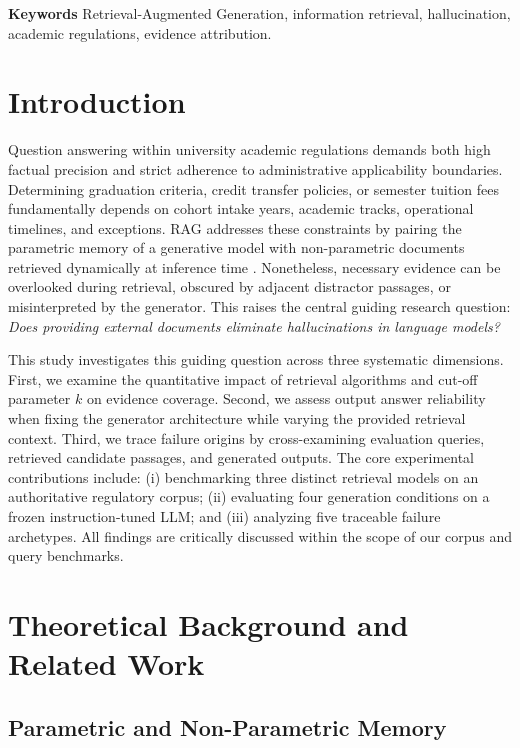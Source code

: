 \documentclass[12pt,a4paper]{article}
\begin{document}
\textbf{Keywords} \textperiodcentered{} Retrieval-Augmented Generation, information retrieval, hallucination, academic regulations, evidence attribution.

\section{Introduction}

Question answering within university academic regulations demands both high factual precision and strict adherence to administrative applicability boundaries. Determining graduation criteria, credit transfer policies, or semester tuition fees fundamentally depends on cohort intake years, academic tracks, operational timelines, and exceptions. RAG addresses these constraints by pairing the parametric memory of a generative model with non-parametric documents retrieved dynamically at inference time \cite{ref1}. Nonetheless, necessary evidence can be overlooked during retrieval, obscured by adjacent distractor passages, or misinterpreted by the generator. This raises the central guiding research question: \emph{Does providing external documents eliminate hallucinations in language models?}

This study investigates this guiding question across three systematic dimensions. First, we examine the quantitative impact of retrieval algorithms and cut-off parameter $k$ on evidence coverage. Second, we assess output answer reliability when fixing the generator architecture while varying the provided retrieval context. Third, we trace failure origins by cross-examining evaluation queries, retrieved candidate passages, and generated outputs. The core experimental contributions include: (i) benchmarking three distinct retrieval models on an authoritative regulatory corpus; (ii) evaluating four generation conditions on a frozen instruction-tuned LLM; and (iii) analyzing five traceable failure archetypes. All findings are critically discussed within the scope of our corpus and query benchmarks.

\section{Theoretical Background and Related Work}

\subsection{Parametric and Non-Parametric Memory}
\end{document}
